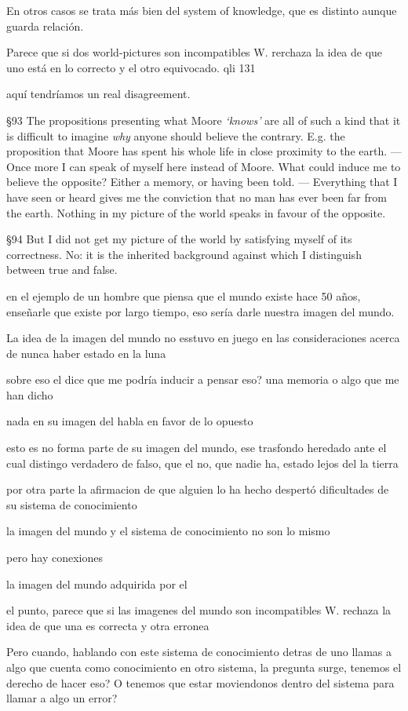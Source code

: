 En otros casos se trata más bien del system of knowledge, que es distinto aunque guarda relación.

Parece que si dos world-pictures son incompatibles W. rerchaza la idea de que uno está en lo correcto y el otro equivocado. qli 131

aquí tendríamos un real disagreement.


\S93 The propositions presenting what Moore \emph{`knows'} are all of such a kind that it is difficult to imagine \emph{why} anyone should believe the contrary. E.g. the proposition that Moore has spent his whole life in close proximity to the earth. ---Once more I can speak of myself here instead of Moore. What could induce me to believe the opposite? Either a memory, or having been told. --- Everything that I have seen or heard gives me the conviction that no man has ever been far from the earth. Nothing in my picture of the world speaks in favour of the opposite.

\S94 But I did not get my picture of the world by satisfying myself of its correctness. No: it is the inherited background against which I distinguish between true and false.

en el ejemplo de un hombre que piensa que el mundo existe hace 50 años, enseñarle que existe por largo tiempo, eso sería darle nuestra imagen del mundo.

La idea de la imagen del mundo no esstuvo en juego en las consideraciones acerca de nunca haber estado en la luna

sobre eso el dice que me podría inducir a pensar eso?
una memoria o algo que me han dicho

nada en su imagen del habla en favor de lo opuesto

esto es no forma parte de su imagen del mundo, ese trasfondo heredado ante el cual distingo verdadero de falso, que el no, que nadie ha, estado lejos del la tierra

por otra parte la afirmacion de que alguien lo ha hecho despertó dificultades de su sistema de conocimiento

la imagen del mundo y el sistema de conocimiento no son lo mismo

pero hay conexiones

  la imagen del mundo adquirida por el

el punto, parece que si las imagenes del mundo son incompatibles W. rechaza la idea de que una es correcta y otra erronea

Pero cuando, hablando con este sistema de conocimiento detras de uno llamas a algo que cuenta como conocimiento en otro sistema, la pregunta surge, tenemos el derecho de hacer eso? O tenemos que estar moviendonos dentro del sistema para llamar a algo un error?

